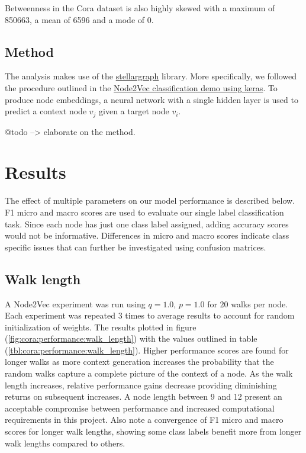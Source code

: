 \documentclass[a4paper,10pt]{article}
\begin{document}
Betweenness in the Cora dataset is also highly skewed with a maximum of 850663, a mean of 6596 and a mode of 0.



\subsection{Method}

The analysis makes use of the \href{https://stellargraph.readthedocs.io}{stellargraph} library. More specifically, we followed the procedure outlined in the \href{https://stellargraph.readthedocs.io/en/stable/demos/node-classification/keras-node2vec-node-classification.html}{Node2Vec classification demo using keras}. To produce node embeddings, a neural network with a single hidden layer is used to predict a context node $v_j$ given a target node $v_i$.

@todo --> elaborate on the method.

\section{Results}

The effect of multiple parameters on our model performance is described below. F1 micro and macro scores are used to evaluate our single label classification task. Since each node has just one class label assigned, adding accuracy scores would not be informative. Differences in micro and macro scores indicate class specific issues that can further be investigated using confusion matrices.

\subsection{Walk length}

A Node2Vec experiment was run using $q = 1.0$, $p = 1.0$ for $20$ walks per node. Each experiment was repeated $3$ times to average results to account for random initialization of weights. The results plotted in figure (\ref{fig:cora:performance:walk_length}) with the values outlined in table (\ref{tbl:cora:performance:walk_length}). Higher performance scores are found for longer walks as more context generation increases the probability that the random walks capture a complete picture of the context of a node. As the walk length increases, relative performance gains decrease providing diminishing returns on subsequent increases. A node length between 9 and 12 present an acceptable compromise between performance and increased computational requirements in this project. Also note a convergence of F1 micro and macro scores for longer walk lengths, showing some class labels benefit more from longer walk lengths compared to others.
\end{document}
